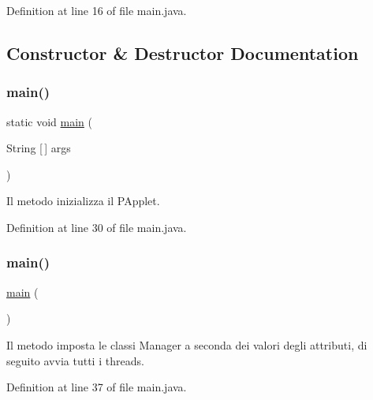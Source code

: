 Definition at line 16 of file main.\+java.



\subsection{Constructor \& Destructor Documentation}
\mbox{\label{classmain_a8b260eecbaabcef8473fd87ada040682}} 
\subsubsection{\texorpdfstring{main()}{main()}\hspace{0.1cm}{\footnotesize\ttfamily [1/2]}}
{\footnotesize\ttfamily static void \mbox{\hyperlink{classmain}{main}} (\begin{DoxyParamCaption}\item[{String \mbox{[}$\,$\mbox{]}}]{args }\end{DoxyParamCaption})\hspace{0.3cm}{\ttfamily [static]}}



Il metodo inizializza il P\+Applet. 



Definition at line 30 of file main.\+java.

\mbox{\label{classmain_a51af30a60f9f02777c6396b8247e356f}} 
\subsubsection{\texorpdfstring{main()}{main()}\hspace{0.1cm}{\footnotesize\ttfamily [2/2]}}
{\footnotesize\ttfamily \mbox{\hyperlink{classmain}{main}} (\begin{DoxyParamCaption}{ }\end{DoxyParamCaption})}



Il metodo imposta le classi Manager a seconda dei valori degli attributi, di seguito avvia tutti i threads. 



Definition at line 37 of file main.\+java.

